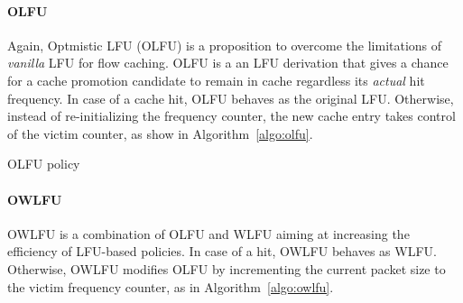 \paragraph{OLFU}
Again, Optmistic LFU (OLFU) is a proposition to overcome the limitations of \textit{vanilla} LFU for flow caching.
OLFU is a an LFU derivation that gives a chance for a cache promotion candidate to remain in cache regardless its \textit{actual} hit frequency.
In case of a cache hit, OLFU behaves as the original LFU.
Otherwise, instead of re-initializing the frequency counter, the new cache entry takes control of the victim counter, as show in Algorithm~\ref{algo:olfu}.

\begin{algorithm}[]
\caption{OLFU policy}
\label{algo:olfu}
\SetInd{0.1em}{.9em}
\SetAlgoLined
\footnotesize
{}
%
%
%
%
%
\end{algorithm}


\paragraph{OWLFU}
OWLFU is a combination of OLFU and WLFU aiming at increasing the efficiency of LFU-based policies.
In case of a hit, OWLFU behaves as WLFU.
Otherwise, OWLFU modifies OLFU by incrementing the current packet size to the victim frequency counter, as in Algorithm~\ref{algo:owlfu}.

